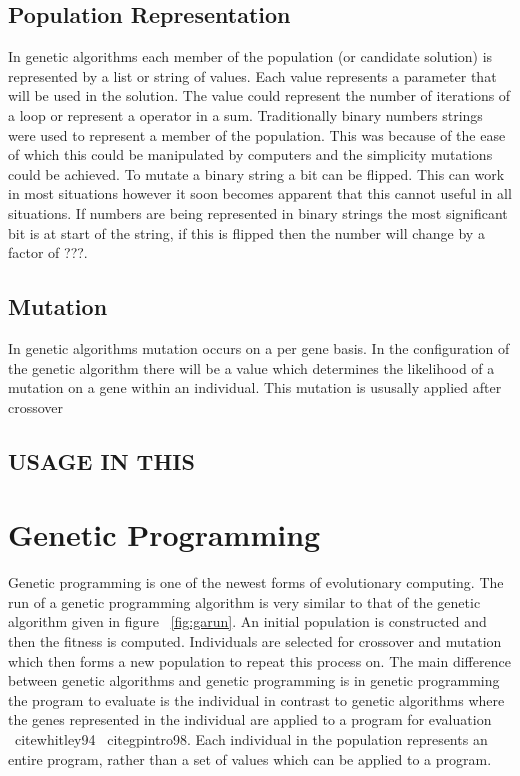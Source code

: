 \documentclass[12pt]{article}
\begin{document}
\subsection{Population Representation}
In genetic algorithms each member of the population (or candidate solution) is represented by a list or string of values.
Each value represents a parameter that will be used in the solution.
The value could represent the number of iterations of a loop or represent a operator in a sum.
Traditionally binary numbers strings were used to represent a member of the population.
This was because of the ease of which this could be manipulated by computers and the simplicity mutations could be achieved.
To mutate a binary string a bit can be flipped.
This can work in most situations however it soon becomes apparent that this cannot useful in all situations.
If numbers are being represented in binary strings the most significant bit is at start of the string, if this is flipped 
then the number will change by a factor of ???.


\subsection{Mutation}
In genetic algorithms mutation occurs on a per gene basis. In the configuration of the genetic algorithm there will be a value which 
determines the likelihood of a mutation on a gene within an individual. This mutation is ususally applied after crossover 

\subsection{USAGE IN THIS}

\section{Genetic Programming}
Genetic programming is one of the newest forms of evolutionary computing. 
The run of a genetic programming algorithm is very similar to that of the genetic algorithm given in figure ~\ref{fig:garun}. An initial
population is constructed and then the fitness is computed. Individuals are selected for crossover and mutation which then forms a new 
population to repeat this process on. The main difference between genetic algorithms and genetic programming is in genetic programming
the program to evaluate is the individual in contrast to genetic algorithms where the genes represented in the individual are applied to
a program for evaluation ~cite{whitley94} ~cite{gpintro98}. Each individual in the population represents an entire program, rather than a set of values which can be
applied to a program. 
\end{document}
